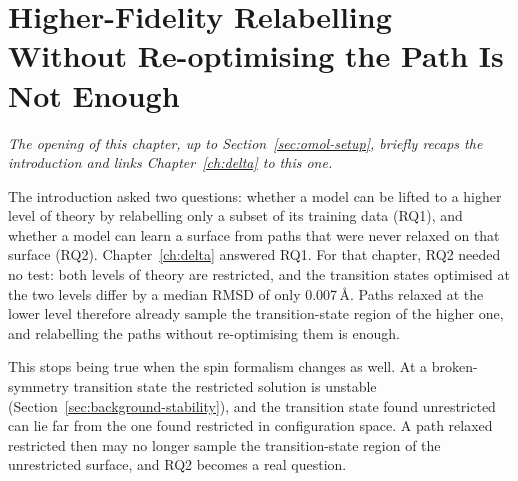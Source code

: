 %
%

\chapter{Higher-Fidelity Relabelling Without Re-optimising the Path Is Not Enough}
\label{ch:mr}

\emph{The opening of this chapter, up to Section~\ref{sec:omol-setup},
briefly recaps the introduction and links Chapter~\ref{ch:delta} to
this one.}

The introduction asked two questions: whether a model can be lifted
to a higher level of theory by relabelling only a subset of its
training data (RQ1), and whether a model can learn a surface from
paths that were never relaxed on that surface (RQ2).
Chapter~\ref{ch:delta} answered RQ1. For that chapter, RQ2 needed no
test: both levels of theory are restricted, and the transition states
optimised at the two levels differ by a median RMSD of only
0.007\,\AA{}. Paths relaxed at the lower level therefore already sample
the transition-state region of the higher one, and relabelling the
paths without re-optimising them is enough.

This stops being true when the spin formalism changes as well. At a
broken-symmetry transition state the restricted solution is unstable
(Section~\ref{sec:background-stability}), and the transition
state found unrestricted can lie far from the one found restricted in
configuration space. A path relaxed restricted then may no longer
sample the transition-state region of the unrestricted surface, and RQ2
becomes a real question.

